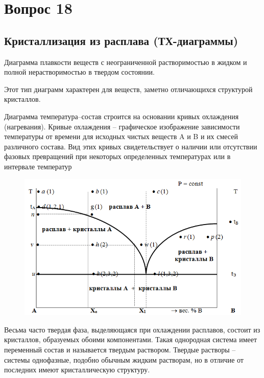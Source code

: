 \documentclass[14pt,a4paper]{scrartcl}
\begin{document}
\section*{Вопрос 18}
\subsection*{Кристаллизация из расплава (ТХ-диаграммы)}
Диаграмма плавкости веществ с неограниченной растворимостью в жидком и полной нерастворимостью в твердом состоянии.

Этот тип диаграмм характерен для веществ, заметно отличающихся структурой кристаллов.

Диаграмма температура–состав строится на основании кривых охлаждения (нагревания). Кривые охлаждения – графическое изображение зависимости температуры от времени для исходных чистых веществ A и B и их смесей различного состава. Вид этих кривых свидетельствует о наличии или отсутствии фазовых превращений при некоторых определенных температурах или в интервале температур 
\begin{figure}[htp]
\centering
\includegraphics[scale=.500]{cristallization-diagram.png}
\caption{}
\label{}
\end{figure}

Весьма часто твердая фаза, выделяющаяся при охлаждении расплавов, состоит из кристаллов, образуемых обоими компонентами. Такая однородная система имеет переменный состав и называется твердым раствором. Твердые растворы – системы однофазные, подобно обычным жидким растворам, но в отличие от последних имеют кристаллическую структуру.
\end{document}
